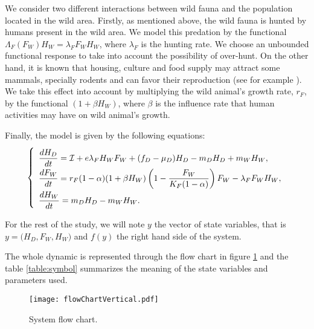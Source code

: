 \documentclass{article}
\newcommand{\lfw}{\lambda_{F}}
\newcommand{\lfw}{\lambda_{F}}
\newcommand{\cI}{\mathcal{I}}
\theoremstyle{definition}
\theoremstyle{remark}
\begin{document}
We consider two different interactions between wild fauna and the population located in the wild area. Firstly, as mentioned above, the wild fauna is hunted by humans present in the wild area. We model this predation by the functional $\Lambda_F(F_W)H_W =  \lfw F_W H_W$, where $\lfw$ is the hunting rate. We choose an unbounded functional response to take into account the possibility of over-hunt. On the other hand, it is known that housing, culture and food supply may attract some mammals, specially rodents and can favor their reproduction (see for example \cite{dobigny_zoonotic_2022, dounias_foraging_2011}). We take this effect into account by multiplying the wild animal's growth rate, $r_F$, by the functional $(1 +  \beta H_W)$, where $\beta$ is the influence rate that human activities may have on wild animal's growth.

\medskip
Finally, the model is given by the following equations:
\begin{equation}
\def\arraystretch{2}
\left\{ 
\begin{array}{l}
\dfrac{dH_D}{dt}= \cI + e\lfw H_W F_W + (f_D - \mu_D) H_D - m_D H_D + m_W H_W, \\
\dfrac{dF_W}{dt} = r_F(1- \alpha) (1+ \beta H_W) \left(1 - \dfrac{F_W}{K_F(1-\alpha)} \right) F_W - \lfw F_W H_W,\\
\dfrac{dH_W}{dt}= m_D H_D - m_W H_W.
\end{array} \right.
\label{equation:HDFWHW}
\end{equation}

For the rest of the study, we will note $y$ the vector of state variables, that is $y = \Big(H_D, F_W, H_W \Big)$ and $f(y)$ the right hand side of the system.

The whole dynamic is represented through the flow chart in figure \ref{fig:flow chart} and the table \ref{table:symbol} summarizes the meaning of the state variables and parameters used.

\begin{figure}[!ht]
\centering
\texttt{[image: flowChartVertical.pdf]}
\caption{System flow chart.}
\label{fig:flow chart}
\end{figure}
\end{document}
